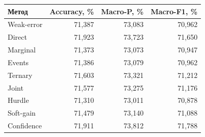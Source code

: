 \begin{tabular}{lrrr}
\toprule
Метод & Accuracy, \% & Macro-P, \% & Macro-F1, \% \\
\midrule
Weak-error & 71{,}387 & 73{,}083 & 70{,}962 \\
Direct & 71{,}923 & 73{,}723 & 71{,}650 \\
Marginal & 71{,}373 & 73{,}073 & 70{,}947 \\
Events & 71{,}386 & 73{,}079 & 70{,}962 \\
Ternary & 71{,}603 & 73{,}321 & 71{,}212 \\
Joint & 71{,}577 & 73{,}275 & 71{,}176 \\
Hurdle & 71{,}310 & 73{,}011 & 70{,}878 \\
Soft-gain & 71{,}479 & 73{,}140 & 71{,}088 \\
Confidence & 71{,}911 & 73{,}812 & 71{,}788 \\
\bottomrule
\end{tabular}
